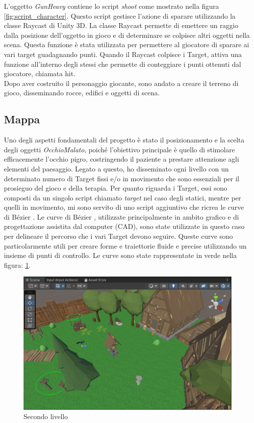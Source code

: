 \documentclass[
a4paper,
cleardoublepage=empty,
headings=twolinechapter,
numbers=autoenddot,
]{scrbook}
\begin{document}
	L'oggetto \textit{GunHeavy} contiene lo script \textit{shoot} come mostrato nella figura \ref{fig:script_character}. Questo script gestisce l'azione di sparare utilizzando la classe Raycast di Unity 3D. La classe Raycast permette di emettere un raggio dalla posizione dell'oggetto in gioco e di determinare se colpisce altri oggetti nella scena. Questa funzione è stata utilizzata per permettere al giocatore di sparare ai vari target guadagnando punti.
	Quando il Raycast colpisce i Target, attiva una funzione all'interno degli stessi che permette di conteggiare i punti ottenuti dal giocatore, chiamata hit.\\
	Dopo aver costruito il personaggio giocante, sono andato a creare il terreno di gioco, disseminando rocce, edifici e oggetti di scena.
	\subsection{Mappa}
	Uno degli aspetti fondamentali del progetto è stato il posizionamento e la scelta degli oggetti \textit{OcchioMalato}, poiché l'obiettivo principale è quello di stimolare efficacemente l'occhio pigro, costringendo il paziente a prestare attenzione agli elementi del paesaggio. Legato a questo, ho disseminato ogni livello con un determinato numero di Target fissi e/o in movimento che sono essenziali per il prosieguo del gioco e della terapia. Per quanto riguarda i Target, essi sono composti da un singolo script chiamato \textit{target} nel caso degli statici, mentre per quelli in movimento, mi sono servito di uno script aggiuntivo che ricrea le curve di Bézier \cite{Pack_asset}.
	Le curve di Bézier \cite{Path_asset}, utilizzate principalmente in ambito grafico e di progettazione assistita dal computer (CAD), sono state utilizzate in questo caso per delineare il percorso che i vari Target devono seguire. Queste curve sono particolarmente utili per creare forme e traiettorie fluide e precise utilizzando un insieme di punti di controllo. Le curve sono state rappresentate in verde nella figura: \ref{fig:mappa}.
	\begin{figure}[H]
		\centering
		\includegraphics[width=0.6\linewidth]{image/mappa}
		\caption{Secondo livello}
		\label{fig:mappa}
	\end{figure}
\end{document}
